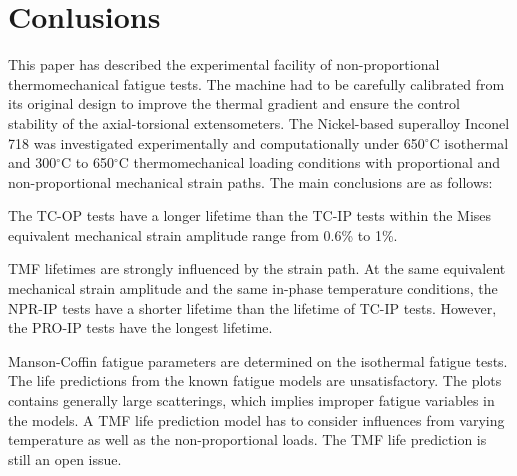 \documentclass[preprint,5p,twocolumn,11pt,sort&compress]{elsarticle}
\begin{document}
\section{Conlusions}

This paper has described the experimental facility of non-proportional thermomechanical fatigue tests. The machine had to be carefully calibrated from its original design to improve the thermal gradient and ensure the control stability of the axial-torsional extensometers. The Nickel-based superalloy Inconel 718 was investigated experimentally and computationally under 650$^\circ$C isothermal and 300$^\circ$C to 650$^\circ$C thermomechanical loading conditions with proportional and non-proportional mechanical strain paths. The main conclusions are as follows:


The TC-OP tests have a longer lifetime than the TC-IP tests within the Mises equivalent mechanical strain amplitude range from 0.6\% to 1\%.

TMF lifetimes are strongly influenced by the strain path. At the same equivalent mechanical strain amplitude and the same in-phase temperature conditions, the NPR-IP tests have a shorter lifetime than the lifetime of TC-IP tests. However, the PRO-IP tests have the longest lifetime.

Manson-Coffin fatigue parameters are determined on the isothermal fatigue tests.
The life predictions from the known fatigue models are unsatisfactory. The plots contains generally large scatterings, which implies improper fatigue variables in the models.
A TMF life prediction model has to consider influences from varying temperature as well as the non-proportional loads. The TMF life prediction is still an open issue.


\end{document}
